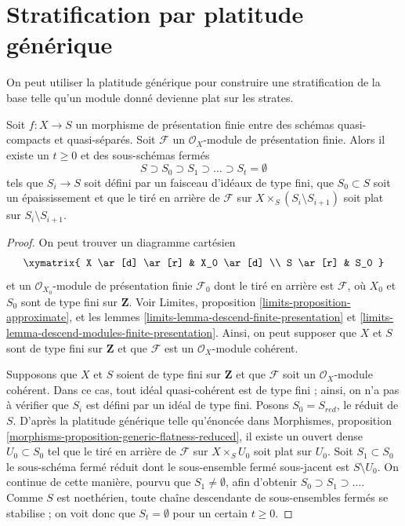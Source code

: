 \section{Stratification par platitude générique}
\label{section-generic-flatness-stratification}

\noindent
On peut utiliser la platitude générique pour construire une
stratification de la base telle qu'un module donné
devienne plat sur les strates.

\begin{lemma}
\label{lemma-generic-flatness-stratification}
Soit $f : X \to S$ un morphisme de présentation finie entre des schémas quasi-compacts
et quasi-séparés. Soit $\mathcal{F}$ un $\mathcal{O}_X$-module
de présentation finie. Alors il existe un $t \geq 0$ et des sous-schémas
fermés
$$
S \supset S_0 \supset S_1 \supset \ldots \supset S_t = \emptyset
$$
tels que $S_i \to S$ soit défini par un faisceau d'idéaux de type fini,
que $S_0 \subset S$ soit un épaississement et que le tiré en arrière de $\mathcal{F}$ sur
$X \times_S (S_i \setminus S_{i + 1})$ soit plat sur $S_i \setminus S_{i + 1}$.
\end{lemma}

\begin{proof}
On peut trouver un diagramme cartésien
$$
\xymatrix{
X \ar[d] \ar[r] & X_0 \ar[d] \\
S \ar[r] & S_0
}
$$
et un $\mathcal{O}_{X_0}$-module de présentation finie $\mathcal{F}_0$
dont le tiré en arrière est $\mathcal{F}$, où $X_0$ et $S_0$ sont de
type fini sur $\mathbf{Z}$. Voir
Limites, proposition \ref{limits-proposition-approximate}, et
les lemmes \ref{limits-lemma-descend-finite-presentation} et
\ref{limits-lemma-descend-modules-finite-presentation}.
Ainsi, on peut supposer que $X$ et $S$ sont de type fini sur $\mathbf{Z}$
et que $\mathcal{F}$ est un $\mathcal{O}_X$-module cohérent.

\medskip\noindent
Supposons que $X$ et $S$ soient de type fini sur $\mathbf{Z}$
et que $\mathcal{F}$ soit un $\mathcal{O}_X$-module cohérent.
Dans ce cas, tout idéal quasi-cohérent est de type fini ; ainsi,
on n'a pas à vérifier que $S_i$ est défini
par un idéal de type fini. Posons $S_0 = S_{red}$, le réduit de $S$.
D'après la platitude générique telle qu'énoncée dans Morphismes, proposition
\ref{morphisms-proposition-generic-flatness-reduced},
il existe un ouvert dense $U_0 \subset S_0$ tel que le tiré en arrière de $\mathcal{F}$
sur $X \times_S U_0$ soit plat sur $U_0$.
Soit $S_1 \subset S_0$ le sous-schéma fermé réduit dont
le sous-ensemble fermé sous-jacent est $S \setminus U_0$. On continue de cette
manière, pourvu que $S_1 \not = \emptyset$, afin d'obtenir
$S_0 \supset S_1 \supset \ldots$. Comme $S$
est noethérien, toute chaîne descendante de sous-ensembles fermés se stabilise ;
on voit donc que $S_t = \emptyset$ pour un certain $t \geq 0$.
\end{proof}

